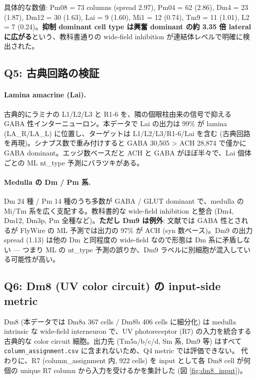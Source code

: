 \documentclass[11pt,a4paper]{ltjsarticle}
\begin{document}
具体的な数値: Pm08 = 73 columns (spread 2.97), Pm04 = 62 (2.86), Dm4 = 23 (1.87), Dm12 = 30 (1.63), Lai = 9 (1.60), Mi1 = 12 (0.74), Tm9 = 11 (1.01), L2 = 7 (0.24)。\textbf{抑制 dominant cell type は興奮 dominant の約 3.35 倍 lateral に広がる}という、教科書通りの wide-field inhibition が連結体レベルで明確に検出された。

\subsection{Q5: 古典回路の検証}\label{sec:q5}

\paragraph{Lamina amacrine (Lai).}
古典的にラミナの L1/L2/L3 と R1-6 を、隣の個眼柱由来の信号で抑える GABA 性インターニューロン。本データで Lai の出力は 99\% が lamina (LA\_R/LA\_L) に位置し、ターゲットは L1/L2/L3/R1-6/Lai を含む (古典回路を再現)。シナプス数で重み付けすると GABA 30,505 > ACH 28,874 で僅かに GABA dominant。エッジ数ベースだと ACH と GABA がほぼ半々で、Lai 個体ごとの ML nt\_type 予測にバラツキがある。

\paragraph{Medulla の Dm / Pm 系.}
Dm 24 種 / Pm 14 種のうち多数が GABA / GLUT dominant で、medulla の Mi/Tm 系を広く支配する。教科書的な wide-field inhibition と整合 (Dm4, Dm12, Dm3p, Pm 全種など)。\textbf{ただし Dm9 は例外}: 文献では GABA 性とされるが FlyWire の ML 予測では出力の 97\% が ACH (syn 数ベース)。Dm9 の出力 spread (1.13) は他の Dm と同程度の wide-field なので形態は Dm 系に矛盾しない — つまり ML の nt\_type 予測の誤りか、Dm9 ラベルに別細胞が混入している可能性が高い。

\subsection{Q6: Dm8 (UV color circuit) の input-side metric}\label{sec:q6}

Dm8 (本データでは Dm8a 367 cells / Dm8b 406 cells に細分化) は medulla intrinsic な wide-field interneuron で、UV photoreceptor (R7) の入力を統合する古典的な color circuit 細胞。出力先 (Tm5a/b/c/d, Sm 系, Dm9 等) はすべて \texttt{column\_assignment.csv} に含まれないため、Q4 metric では評価できない。
代わりに、R7 (column\_assignment 内, 922 cells) を input として各 Dm8 cell が何個の unique R7 column から入力を受けるかを集計した (図 \ref{fig:dm8_input})。
\end{document}
